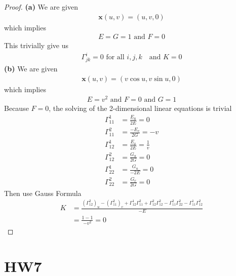 \documentclass{report}
\begin{document}
\begin{proof}
\textbf{(a)}
We are given 
\begin{align*}
\textbf{x}(u,v)=(u,v,0)
\end{align*}
which implies 
\begin{align*}
E=G=1\text{ and }F=0
\end{align*}
This trivially give us 
\begin{align*}
\Gamma^{i}_{jk}=0\text{ for all $i,j,k$ }\text{ and }K=0
\end{align*}
\textbf{(b)} We are given 
\begin{align*}
\textbf{x}(u,v)=(v\cos u, v\sin u, 0 )
\end{align*}
which implies 
\begin{align*}
E=v^2\text{ and }F=0\text{ and }G=1
\end{align*}
Because $F=0$, the solving of the 2-dimensional linear equations is trivial
 \begin{align*}
\Gamma^1_{11}&= \frac{E_u}{2E}=0\\
\Gamma^2_{11}&= \frac{-E_v}{2G}= -v\\
\Gamma^1_{12}&= \frac{E_v}{2E}= \frac{1}{v}\\
\Gamma^2_{12}&= \frac{G_u}{2G}=0\\
\Gamma^1_{22}&= \frac{G_u}{-2E}=0\\
\Gamma^2_{22}&= \frac{G_v}{2G}=0
\end{align*}
Then use Gauss Formula 
\begin{align*}
K&= \frac{(\Gamma^2_{12})_u - (\Gamma ^2_{11})_v + \Gamma ^1_{12}\Gamma ^2_{11}+\Gamma ^2_{12}\Gamma ^2_{12}-\Gamma^2_{11}\Gamma ^2_{22}-\Gamma ^1_{11}\Gamma ^2_{12}}{-E}\\
&=\frac{1-1}{-v^2}=0
\end{align*}
\end{proof}
\section{HW7}
\end{document}
